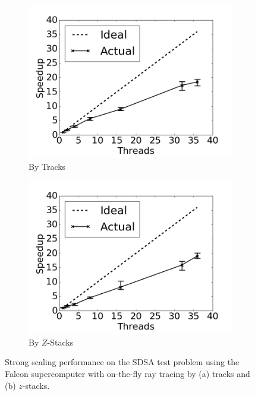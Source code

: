 \begin{figure}[h!]
	\centering
	\begin{subfigure}{0.48\textwidth}
		\centering
		\includegraphics[width=\linewidth]{figures/fs-parallel-scaling-tracks.png}
		\caption{By Tracks}
		\label{fig:rt-parallel-fs-tracks}
	\end{subfigure}
	\begin{subfigure}{0.48\textwidth}
		\centering
		\includegraphics[width=\linewidth]{figures/fs-parallel-scaling-stacks.png}
		\caption{By $Z$-Stacks}
		\label{fig:rt-parallel-fs-stacks}
	\end{subfigure}
	\caption[]{Strong scaling performance on the SDSA test problem using the Falcon supercomputer with on-the-fly ray tracing by (a) tracks and (b) $z$-stacks.}
	\label{fig:rt-parallel-fs}
\end{figure}

